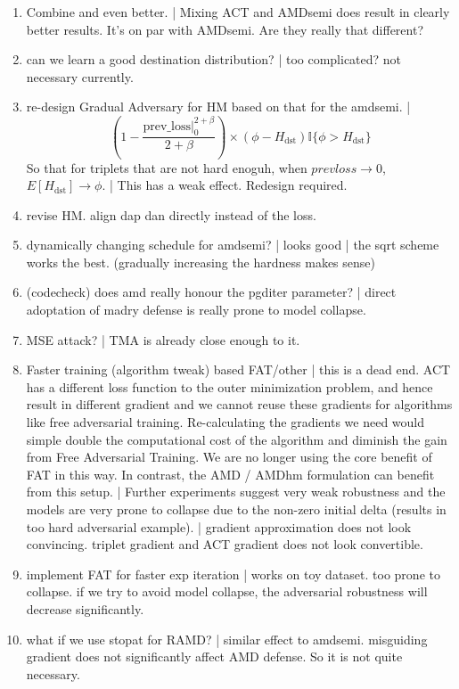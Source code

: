 \begin{enumerate}
	\item [\xmark] Combine and even better. | Mixing ACT and AMDsemi does result
		in clearly better results. It's on par with AMDsemi. Are they really
		that different?

	\item [\xmark] can we learn a good destination distribution? | too
		complicated? not necessary currently.

	\item [\xmark] re-design Gradual Adversary for HM based on that for the amdsemi. |
		\[
			(1-\frac{\text{prev\_loss}|_0^{2+\beta}}{2+\beta}) \times
			(\phi - H_\text{dst})\mathbb{I}\{\phi > H_\text{dst}\}
		\]
		So that for triplets that are not hard enoguh, when
		$prevloss \rightarrow 0$, $E[H_\text{dst}]\rightarrow \phi$.
		| This has a weak effect. Redesign required.
	
	\item [\cmark] revise HM. align dap dan directly instead of the loss.

	\item [\cmark] \checkmark dynamically changing schedule for amdsemi? |
		looks good | the sqrt scheme works the best. (gradually increasing the
		hardness makes sense)

	\item [\cmark] (codecheck) does amd really honour the pgditer parameter? |
		direct adoptation of madry defense is really prone to model collapse.

	\item [\xmark] MSE attack? | TMA is already close enough to it.

	\item [\xmark] Faster training (algorithm tweak) based FAT/other | this is
		a dead end. ACT has a different loss function to the outer minimization
		problem, and hence result in different gradient and we cannot reuse
		these gradients for algorithms like free adversarial training.
		Re-calculating the gradients we need would simple double the
		computational cost of the algorithm and diminish the gain from Free
		Adversarial Training. We are no longer using the core benefit of FAT in
		this way. In contrast, the AMD / AMDhm formulation can benefit from
		this setup. | Further experiments suggest very weak robustness and the
		models are very prone to collapse due to the non-zero initial delta
		(results in too hard adversarial example).  | gradient approximation
		does not look convincing. triplet gradient and ACT gradient does not
		look convertible.

	\item [\cmark] implement FAT for faster exp iteration | works on toy
		dataset. too prone to collapse. if we try to avoid model collapse, the
		adversarial robustness will decrease significantly.

	\item [\cmark] what if we use stopat for RAMD? | similar effect to amdsemi.
		misguiding gradient does not significantly affect AMD defense. So it
		is not quite necessary.
	
\end{enumerate}
